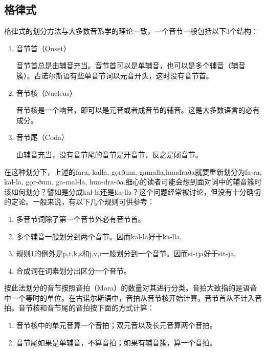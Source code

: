 \subsection{格律式}

格律式的划分方法与大多数音系学的理论一致，一个音节一般包括以下3个结构：
\begin{enumerate}
  \item 音节首（Onset）

        音节首总是由辅音充当。音节首可以是单辅音，也可以是多个辅音（辅音簇）。古诺尔斯语有些单音节词以元音开头，这时没有音节首。
  \item 音节核（Nucleus）

        音节核是一个响音，即可以是元音或者成音节的辅音。这是大多数语言的必有成分。
  \item 音节尾（Coda）

        由辅音充当，没有音节尾的音节是开音节，反之是闭音节。

\end{enumerate}

在这种划分下，上述的fara, kalla, gǫrðum, gamalla,hundraða就要重新划分为fa-ra, kal-la, gǫr-ðum, ga-mal-la, hun-dra-ða.细心的读者可能会想到面对词中的辅音簇时该如何划分？譬如是分成kal-la还是ka-lla？这个问题经常被讨论，但没有十分确切的定论。一般来说，有以下几个规则可供参考：

\begin{info}
  \begin{enumerate}
    \item 多音节词除了第一个音节外必有音节首。
    \item 多个辅音一般划分到两个音节。因而kal-la好于ka-lla.
    \item 规则1的例外是p,t,k,s和j,v,r一般划分到一个音节。因而si-tja好于sit-ja.
    \item 合成词在词素划分出区分一个音节。
  \end{enumerate}
\end{info}

按此法划分的音节按照音拍（Mora）的数量对其进行分类。音拍大致指的是语音中一个等时的单位。在古诺尔斯语中，音拍从音节核开始计算，音节首从不计入音拍。音节核和音节尾的音拍按下面的方式计算：

\begin{info}
  \begin{enumerate}
    \item 音节核中的单元音算一个音拍；双元音以及长元音算两个音拍。
    \item 音节尾如果是单辅音，不算音拍；如果有辅音簇，算一个音拍。
  \end{enumerate}
\end{info}

